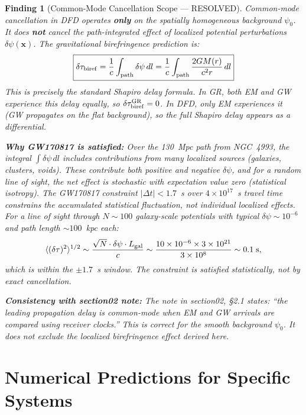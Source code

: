 \documentclass[11pt]{article}
\newtheorem{finding}{Finding}
\newcommand{\ee}[1]{\times 10^{#1}}
\begin{document}
\begin{finding}[Common-Mode Cancellation Scope --- RESOLVED]
\label{find:common-mode}
Common-mode cancellation in DFD operates \textbf{only} on the
spatially homogeneous background $\psi_0$. It does \textbf{not}
cancel the path-integrated effect of localized potential perturbations
$\delta\psi(\mathbf{x})$. The gravitational birefringence prediction
is:
\begin{equation}
\boxed{
\delta\tau_{\rm biref} = \frac{1}{c}\int_{\rm path} \delta\psi\,dl
= \frac{1}{c}\int_{\rm path} \frac{2GM(r)}{c^2 r}\,dl
}
\end{equation}
This is precisely the standard Shapiro delay formula. In GR, both EM
and GW experience this delay equally, so $\delta\tau_{\rm biref}^{\rm GR}
= 0$. In DFD, only EM experiences it (GW propagates on the flat
background), so the full Shapiro delay appears as a differential.

\textbf{Why GW170817 is satisfied:} Over the 130~Mpc path from
NGC~4993, the integral $\int \delta\psi\,dl$ includes contributions
from many localized sources (galaxies, clusters, voids). These
contribute both positive and negative $\delta\psi$, and for a
\emph{random} line of sight, the net effect is stochastic with
expectation value zero (statistical isotropy). The GW170817 constraint
$|\Delta t| < 1.7$~s over $4\ee{17}$~s travel time constrains the
\emph{accumulated statistical fluctuation}, not individual localized
effects. For a line of sight through $N \sim 100$ galaxy-scale
potentials with typical $\delta\psi \sim 10^{-6}$ and path length
$\sim 100$~kpc each:
\begin{equation}
\langle(\delta\tau)^2\rangle^{1/2} \sim \frac{\sqrt{N}
\cdot \delta\psi \cdot L_{\rm gal}}{c}
\sim \frac{10 \times 10^{-6} \times 3\ee{21}}{3\ee{8}}
\sim 0.1\;\text{s},
\end{equation}
which is within the $\pm 1.7$~s window. The constraint is satisfied
\emph{statistically}, not by exact cancellation.

\textbf{Consistency with section02 note:} The note in section02,
\S2.1 states: ``the leading propagation delay is common-mode when
EM and GW arrivals are compared using receiver clocks.'' This is
correct for the \emph{smooth background} $\psi_0$. It does not
exclude the localized birefringence effect derived here.
\end{finding}


\section{Numerical Predictions for Specific Systems}
\end{document}
